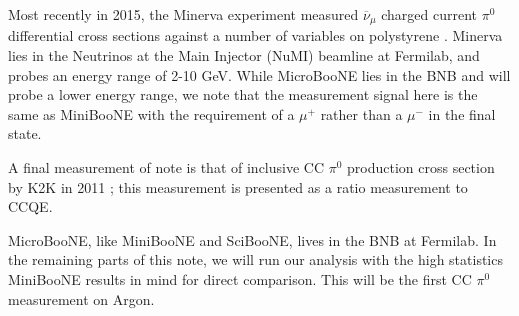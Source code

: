 \documentclass[12pt]{article}
\begin{document}
\par Most recently in 2015, the Minerva experiment measured $\overline{\nu}_\mu$ charged current $\pi^0$ differential cross sections against a number of variables  on polystyrene \cite{bib:minerva_thesis} \cite{bib:minerva_paper}.  Minerva lies in the Neutrinos at the Main Injector (NuMI) beamline at Fermilab, and probes an energy range of 2-10 GeV.  While MicroBooNE lies in the BNB and will probe a lower energy range, we note that the measurement signal here is the same as MiniBooNE with the requirement of a $\mu^+$ rather than a $\mu^-$ in the final state. 
\par A final measurement of note is that of inclusive CC $\pi^0$ production cross section by K2K in 2011 \cite{bib:k2k_paper}; this measurement is presented as a ratio measurement to CCQE.  
\par MicroBooNE, like MiniBooNE and SciBooNE, lives in the BNB at Fermilab.  In the remaining parts of this note, we will run our analysis with the high statistics MiniBooNE results in mind for direct comparison.  This will be the first CC $\pi^0$ measurement on Argon.
\end{document}
